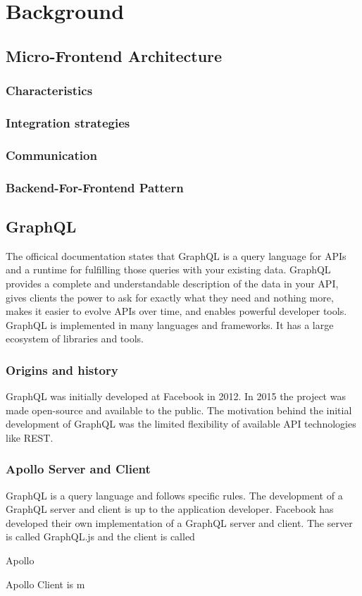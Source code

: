 \chapter{Background}

\section{Micro-Frontend Architecture}

\subsection{Characteristics}

\subsection{Integration strategies}

\subsection{Communication}

\subsection{Backend-For-Frontend Pattern}

\section{GraphQL}

The officical documentation states that GraphQL is a query language for APIs and a runtime for fulfilling those queries with your existing data. GraphQL provides a complete and understandable description of the data in your API, gives clients the power to ask for exactly what they need and nothing more, makes it easier to evolve APIs over time, and enables powerful developer tools. GraphQL is implemented in many languages and frameworks. It has a large ecosystem of libraries and tools.

\subsection{Origins and history}

GraphQL was initially developed at Facebook in 2012. In 2015 the project was made open-source and available to the public. The motivation behind the initial development of GraphQL was the limited flexibility of available API technologies like REST.

\subsection{Apollo Server and Client}

GraphQL is a query language and follows specific rules. The development of a GraphQL server and client is up to the application developer. Facebook has developed their own implementation of a GraphQL server and client. The server is called GraphQL.js and the client is called

Apollo 

Apollo Client is m